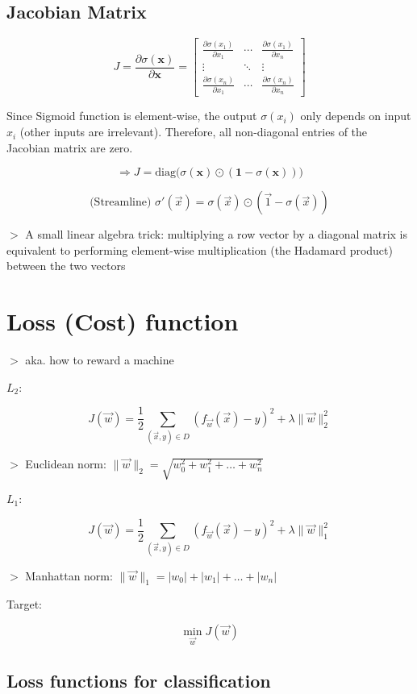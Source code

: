 \documentclass[12pt,a4paper]{article}
\newcommand{\remark}[1]{
    $>$ {\color{blue} #1}
}
\begin{document}
\subsection*{Jacobian Matrix}

\[J = \frac{\partial \sigma(\mathbf{x})}{\partial \mathbf{x}} =
\begin{bmatrix}
\frac{\partial \sigma(x_1)}{\partial x_1} & \cdots & \frac{\partial \sigma(x_1)}{\partial x_n} \\
\vdots & \ddots & \vdots \\
\frac{\partial \sigma(x_n)}{\partial x_1} & \cdots & \frac{\partial \sigma(x_n)}{\partial x_n}
\end{bmatrix}\]

Since Sigmoid function is element-wise, the output $\sigma(x_i)$ only depends on input $x_i$ (other inputs are irrelevant).
Therefore, all non-diagonal entries of the Jacobian matrix are zero.

\[\Rightarrow J = \text{diag}\Big( \sigma(\mathbf{x}) \odot (\mathbf{1} - \sigma(\mathbf{x})) \Big)\]

\[\text{(Streamline) } \sigma'(\vec{x}) = \sigma(\vec{x}) \odot (\vec{1} - \sigma(\vec{x}))\]

\remark{A small linear algebra trick: multiplying a row vector by a diagonal matrix is equivalent to performing element-wise multiplication (the Hadamard product) between the two vectors}

\section*{Loss (Cost) function}

\remark{aka. how to reward a machine}

$L_2$:

\[J(\vec{w}) = \frac{1}{2} \sum_{(\vec{x}, y) \in D} (f_{\vec{w}}(\vec{x}) - y)^2 + \lambda\lVert\vec{w}\rVert_2^2\]

\remark{Euclidean norm: $\lVert\vec{w}\rVert_2 = \sqrt{w_0^2+w_1^2 + \dots + w_n^2}$}

$L_1$:

\[J(\vec{w}) = \frac{1}{2} \sum_{(\vec{x}, y) \in D} (f_{\vec{w}}(\vec{x}) - y)^2 + \lambda\lVert\vec{w}\rVert_1^2\]

\remark{Manhattan norm: $\lVert\vec{w}\rVert_1 = |w_0| + |w_1| + \dots + |w_n|$}


Target:

\[\min_{\vec{w}} J(\vec{w})\]

\subsection*{Loss functions for classification}
\end{document}
